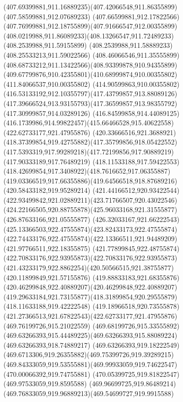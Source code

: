 {{{{				\curveto(407.69399881,911.16889235)(407.42066548,911.86355899)(407.58599881,912.07689233)
				\curveto(407.66599881,912.17822566)(407.76999881,912.18755899)(407.91666547,912.00355899)
				\curveto(408.0219988,911.86089233)(408.13266547,911.72489233)(408.2539988,911.59155899)
				\lineto(408.2539988,911.58889233)
				\lineto(408.25533213,911.59022566)
				\curveto(408.46066546,911.35555899)(408.68733212,911.13422566)(408.93399878,910.94355899)
				\curveto(409.67799876,910.42355801)(410.68999874,910.00355802)(411.84066537,910.00355802)
				\curveto(414.90599863,910.00355802)(416.53133192,912.10355797)(417.43799857,913.88089126)
				\curveto(417.39666524,913.93155793)(417.36599857,913.98355792)(417.30999857,914.03289126)
				\curveto(416.84599858,914.44089125)(416.1739986,914.99822457)(415.66466528,915.40622558)
				\moveto(422.62733177,921.47955876)
				\curveto(420.33666516,921.3688921)(418.37399854,919.42755882)(417.35799856,918.05422552)
				\curveto(417.5393319,917.99289218)(417.72199856,917.90889219)(417.90333189,917.76489219)
				\curveto(418.11533188,917.59422553)(418.42699854,917.3408922)(418.7616652,917.06355887)
				\curveto(419.03366519,917.66355886)(419.64566518,918.87689216)(420.58433182,919.95289214)
				\curveto(421.44166512,920.93422544)(422.93499842,921.02889211)(423.71766507,920.43022546)
				\curveto(424.22166505,920.88755878)(425.96033168,921.31555877)(426.87633166,921.05555877)
				\curveto(426.32033167,921.66222543)(425.13366503,922.47555874)(423.82433173,922.47555874)
				\curveto(422.74433176,922.47555874)(422.13366511,921.94489209)(421.97766511,922.18355875)
				\curveto(421.77899845,922.48755874)(422.70833176,922.93955873)(422.70833176,922.93955873)
				\curveto(421.43233179,922.8862254)(420.50566515,921.38755877)(420.11899849,921.57155876)
				\curveto(419.88833183,921.68355876)(420.46299848,922.40889207)(420.46299848,922.40889207)
				\curveto(419.29633184,921.73155877)(418.31899854,920.29555879)(418.11633188,919.42222548)
				\curveto(419.18966518,920.73555878)(421.27366513,921.67822543)(422.62733177,921.47955876)
				\moveto(469.76199726,915.21022559)
				\curveto(469.68199726,915.33555892)(469.63266393,915.44489225)(469.63266393,915.88089224)
				\lineto(469.63266393,918.74889217)
				\curveto(469.63266393,919.18222549)(469.6713306,919.26355882)(469.75399726,919.39289215)
				\curveto(469.84333059,919.53555881)(469.99933059,919.74622547)(470.00066392,919.74755881)
				\lineto(470.05399725,919.81822547)
				\lineto(469.97533059,919.8595588)
				\curveto(469.96699725,919.86489214)(469.76833059,919.96889213)(469.54699727,919.9915588)
}}}}
